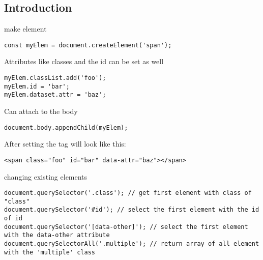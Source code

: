 
\subsection{Introduction}


make element
\begin{verbatim}
const myElem = document.createElement('span');
\end{verbatim}

Attributes like classes and the id can be set as well

\begin{verbatim}
myElem.classList.add('foo');
myElem.id = 'bar';
myElem.dataset.attr = 'baz';
\end{verbatim}

Can attach to the body
\begin{verbatim}
document.body.appendChild(myElem);
\end{verbatim}

After setting the tag will look like this:

\begin{verbatim}
<span class="foo" id="bar" data-attr="baz"></span>
\end{verbatim}

changing existing elements
\begin{verbatim}
document.querySelector('.class'); // get first element with class of "class"
document.querySelector('#id'); // select the first element with the id of id
document.querySelector('[data-other]'); // select the first element with the data-other attribute
document.querySelectorAll('.multiple'); // return array of all element with the 'multiple' class
\end{verbatim}

